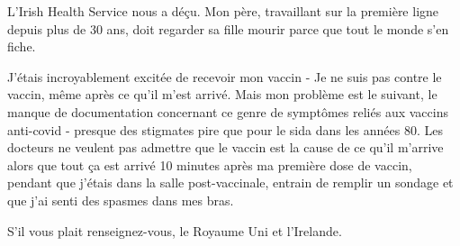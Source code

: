 {L'Irish Health Service nous a déçu. Mon père, travaillant sur la première ligne
depuis plus de 30 ans, doit regarder sa fille mourir parce que tout le monde
s'en fiche.

J'étais incroyablement excitée de recevoir mon vaccin - Je ne suis pas contre le
vaccin, même après ce qu'il m'est arrivé. Mais mon problème est le suivant, le
manque de documentation concernant ce genre de symptômes reliés aux vaccins
anti-covid - presque des stigmates pire que pour le sida dans les années 80. Les
docteurs ne veulent pas admettre que le vaccin est la cause de ce qu'il m'arrive
alors que tout ça est arrivé 10 minutes après ma première dose de vaccin,
pendant que j'étais dans la salle post-vaccinale, entrain de remplir un sondage
et que j'ai senti des spasmes dans mes bras.

S'il vous plait renseignez-vous, le Royaume Uni et l'Irelande.

}
